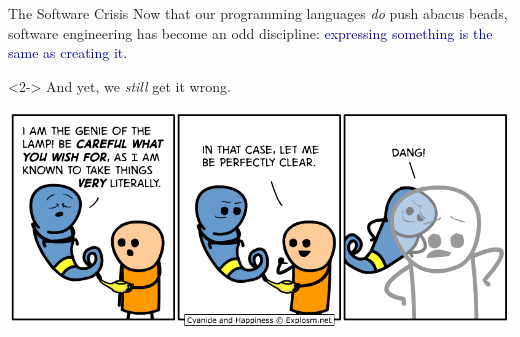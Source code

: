 \documentclass[aspectratio=169]{beamer}
\begin{document}
\begin{frame}{The Software Crisis}
\large
\vspace{1 cm}
Now that our programming languages {\it do} push abacus beads, software engineering has become an odd discipline: \textcolor{darkblue}{expressing something is the same as creating it.}

\vspace{1 cm}
\begin{uncoverenv}<2->
And yet, we {\it still} get it wrong.

\vspace{0.25 cm}
\begin{center}
\includegraphics[width=0.6\linewidth]{literal-genie.png}
\end{center}
\end{uncoverenv}
\end{frame}




\end{document}
